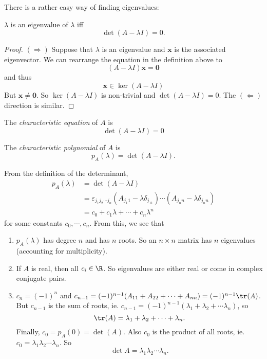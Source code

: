 \documentclass[a4paper]{article}
\begin{document}
There is a rather easy way of finding eigenvalues:
\begin{thm}
  $\lambda$ is an eigenvalue of $\lambda$ iff
  \[
    \det(A - \lambda I) = 0.
  \]
\end{thm}

\begin{proof}
  $(\Rightarrow)$ Suppose that $\lambda$ is an eigenvalue and $\mathbf{x}$ is the associated eigenvector. We can rearrange the equation in the definition above to
  \[
    (A - \lambda I)\mathbf{x} = \mathbf{0}
  \]
  and thus
  \[
    \mathbf{x}\in \ker(A - \lambda I)
  \]
  But $\mathbf{x}\not= \mathbf{0}$. So $\ker(A - \lambda I)$ is non-trivial and $\det(A - \lambda I) = 0$. The $(\Leftarrow)$ direction is similar.
\end{proof}

\begin{defi}
  The \emph{characteristic equation} of $A$ is
  \[
    \det(A - \lambda I) = 0
  \]
\end{defi}

\begin{defi}
  The \emph{characteristic polynomial} of $A$ is
  \[
    p_A(\lambda) = \det(A - \lambda I).
  \]
\end{defi}

From the definition of the determinant,
\begin{align*}
  p_A(\lambda) &= \det(A - \lambda I)\\
  &= \varepsilon_{j_1j_2\cdots j_n} (A_{j_1 1} - \lambda\delta_{j_11})\cdots (A_{j_n n} - \lambda\delta_{j_nn})\\
  &= c_0 + c_1\lambda + \cdots + c_n\lambda^n
\end{align*}
for some constants $c_0, \cdots, c_n$. From this, we see that
\begin{enumerate}
  \item $p_A(\lambda)$ has degree $n$ and has $n$ roots. So an $n\times n$ matrix has $n$ eigenvalues (accounting for multiplicity).
  \item If $A$ is real, then all $c_i\in \R$. So eigenvalues are either real or come in complex conjugate pairs.
  \item $c_n = (-1)^n$ and $c_{n - 1} = (-1)^{n - 1}(A_{11} + A_{22} + \cdots + A_{nn}) = (-1)^{n - 1}\tr(A)$. But $c_{n -1}$ is the sum of roots, ie. $c_{n - 1}= (-1)^{n - 1}(\lambda_1 + \lambda_2 + \cdots \lambda_n)$, so
    \[
      \tr(A) = \lambda_1 + \lambda_2 + \cdots + \lambda_n.
    \]
    Finally, $c_0 = p_A(0) = \det(A)$. Also $c_0$ is the product of all roots, ie. $c_0 = \lambda_1\lambda_2\cdots \lambda_n$. So
    \[
      \det A = \lambda_1\lambda_2\cdots \lambda_n.
    \]
\end{enumerate}
\end{document}
